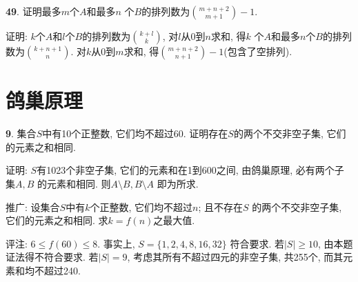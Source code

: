 \documentclass[12pt,a4paper]{article}
\begin{document}
\begin{CJK*}{GBK}{song}
\par \textbf{49}. 证明最多$m$个$A$和最多$n$ 个$B$的排列数为$\binom{m+n+2}{m+1}-1$.
\par 证明: $k$个$A$和$l$个$B$的排列数为$\binom{k+l}{k}$, 对$l$从0到$n$求和, 得$k$ 个$A$和最多$n$个$B$的排列数为$\binom{k+n+1}{n}$. 对$k$从0到$m$求和, 得$\binom{m+n+2}{n+1}-1$(包含了空排列).

\section{鸽巢原理}
\par \textbf{9}. 集合$S$中有10个正整数, 它们均不超过60. 证明存在$S$的两个不交非空子集, 它们的元素之和相同.
\par 证明: $S$有1023个非空子集, 它们的元素和在1到600之间, 由鸽巢原理, 必有两个子集$A,B$ 的元素和相同. 则$A\setminus B,B\setminus A$ 即为所求.
\par 推广: 设集合$S$中有$k$个正整数, 它们均不超过$n$; 且不存在$S$ 的两个不交非空子集, 它们的元素之和相同. 求$k=f(n)$之最大值.
\par 评注: $6\le f(60)\le 8$. 事实上, $S=\{1,2,4,8,16,32\}$ 符合要求. 若$|S|\ge 10$, 由本题证法得不符合要求. 若$|S|=9$, 考虑其所有不超过四元的非空子集, 共255个, 而其元素和均不超过240.


\end{CJK*}
\end{document}
